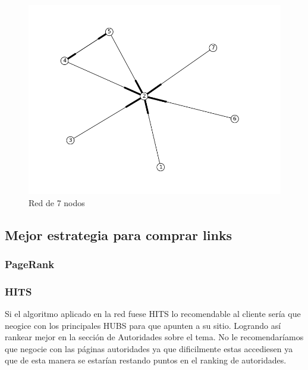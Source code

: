  \begin{figure}[!htb]
\begin{center}
    \includegraphics[scale=0.5]{imagenes/test4.png}
    \caption{Red de 7 nodos}
    \end{center}
\end{figure}

\subsection{Mejor estrategia para comprar links}
\subsubsection{PageRank}

\subsubsection{HITS}
Si el algoritmo aplicado en la red fuese HITS lo recomendable al cliente sería que neogice con los principales HUBS para que apunten a su sitio. Logrando así rankear mejor en la sección de Autoridades sobre el tema. No le recomendaríamos que negocie con las páginas autoridades ya que dificilmente estas accediesen ya que de esta manera se estarían restando puntos en el ranking de autoridades.
